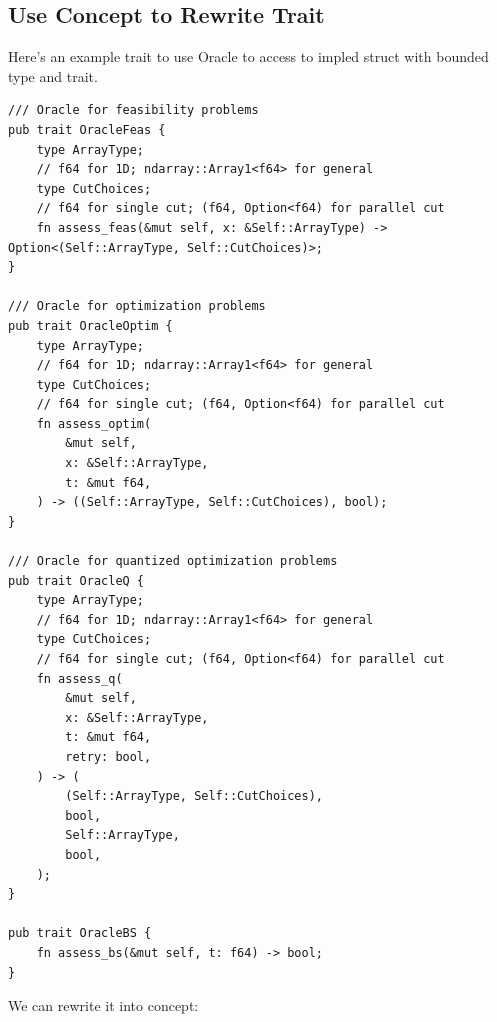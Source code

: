 \documentclass[a4paper]{exam}
\theoremstyle{definition}
\begin{document}
\subsection{Use Concept to Rewrite Trait}
Here's an example trait to use Oracle to access to impled struct with bounded type and trait.
\begin{verbatim}
/// Oracle for feasibility problems
pub trait OracleFeas {
    type ArrayType;
    // f64 for 1D; ndarray::Array1<f64> for general
    type CutChoices;
    // f64 for single cut; (f64, Option<f64) for parallel cut
    fn assess_feas(&mut self, x: &Self::ArrayType) -> Option<(Self::ArrayType, Self::CutChoices)>;
}

/// Oracle for optimization problems
pub trait OracleOptim {
    type ArrayType;
    // f64 for 1D; ndarray::Array1<f64> for general
    type CutChoices;
    // f64 for single cut; (f64, Option<f64) for parallel cut
    fn assess_optim(
        &mut self,
        x: &Self::ArrayType,
        t: &mut f64,
    ) -> ((Self::ArrayType, Self::CutChoices), bool);
}

/// Oracle for quantized optimization problems
pub trait OracleQ {
    type ArrayType;
    // f64 for 1D; ndarray::Array1<f64> for general
    type CutChoices;
    // f64 for single cut; (f64, Option<f64) for parallel cut
    fn assess_q(
        &mut self,
        x: &Self::ArrayType,
        t: &mut f64,
        retry: bool,
    ) -> (
        (Self::ArrayType, Self::CutChoices),
        bool,
        Self::ArrayType,
        bool,
    );
}

pub trait OracleBS {
    fn assess_bs(&mut self, t: f64) -> bool;
}
\end{verbatim}
We can rewrite it into concept:
\end{document}

